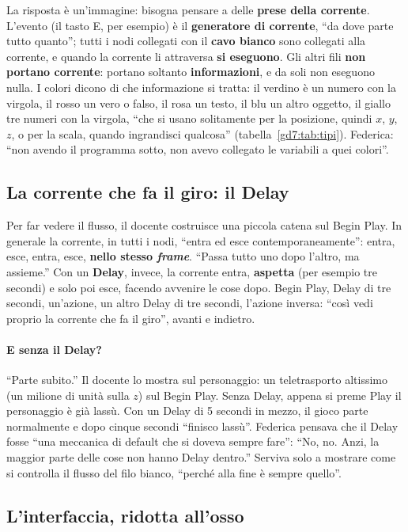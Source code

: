 La risposta è un'immagine: bisogna pensare a delle \textbf{prese della
corrente}. L'evento (il tasto E, per esempio) è il \textbf{generatore di
corrente}, ``da dove parte tutto quanto''; tutti i nodi collegati con il
\textbf{cavo bianco} sono collegati alla corrente, e quando la corrente li
attraversa \textbf{si eseguono}. Gli altri fili \textbf{non portano corrente}:
portano soltanto \textbf{informazioni}, e da soli non eseguono nulla. I
colori dicono di che informazione si tratta: il verdino è un numero con la
virgola, il rosso un vero o falso, il rosa un testo, il blu un altro oggetto,
il giallo tre numeri con la virgola, ``che si usano solitamente per la
posizione, quindi $x$, $y$, $z$, o per la scala, quando ingrandisci
qualcosa'' (tabella~\ref{gd7:tab:tipi}). Federica: ``non avendo il programma
sotto, non avevo collegato le variabili a quei colori''.

\subsection{La corrente che fa il giro: il Delay}

Per far vedere il flusso, il docente costruisce una piccola catena sul Begin
Play. In generale la corrente, in tutti i nodi, ``entra ed esce
contemporaneamente'': entra, esce, entra, esce, \textbf{nello stesso
\emph{frame}}. ``Passa tutto uno dopo l'altro, ma assieme.'' Con un
\textbf{Delay}, invece, la corrente entra, \textbf{aspetta} (per esempio tre
secondi) e solo poi esce, facendo avvenire le cose dopo. Begin Play, Delay di
tre secondi, un'azione, un altro Delay di tre secondi, l'azione inversa: ``così
vedi proprio la corrente che fa il giro'', avanti e indietro.

\paragraph{E senza il Delay?} ``Parte subito.'' Il docente lo mostra sul
personaggio: un teletrasporto altissimo (un milione di unità sulla $z$) sul
Begin Play. Senza Delay, appena si preme Play il personaggio è già lassù. Con
un Delay di 5 secondi in mezzo, il gioco parte normalmente e dopo cinque
secondi ``finisco lassù''. Federica pensava che il Delay fosse ``una meccanica
di default che si doveva sempre fare'': ``No, no. Anzi, la maggior parte delle
cose non hanno Delay dentro.'' Serviva solo a mostrare come si controlla il
flusso del filo bianco, ``perché alla fine è sempre quello''.

\subsection{L'interfaccia, ridotta all'osso}

